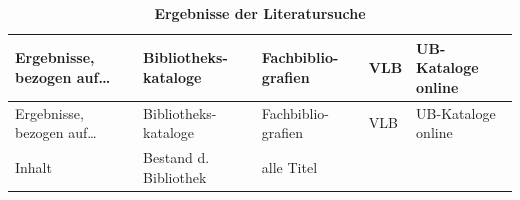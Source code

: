 \documentclass[]{book}
\theoremstyle{definition}
\theoremstyle{definition}
\theoremstyle{definition}
\theoremstyle{remark}
\begin{document}
\begin{longtable}[]{@{}lllll@{}}
\caption{\textbf{\label{tab:literatur-suchen} Ergebnisse der
Literatursuche}}\tabularnewline
\toprule
\begin{minipage}[b]{0.21\columnwidth}\raggedright\strut
Ergebnisse, bezogen auf\ldots{}\strut
\end{minipage} & \begin{minipage}[b]{0.18\columnwidth}\raggedright\strut
Bibliotheks-kataloge\strut
\end{minipage} & \begin{minipage}[b]{0.16\columnwidth}\raggedright\strut
Fachbiblio-grafien\strut
\end{minipage} & \begin{minipage}[b]{0.14\columnwidth}\raggedright\strut
VLB\strut
\end{minipage} & \begin{minipage}[b]{0.18\columnwidth}\raggedright\strut
UB-Kataloge online\strut
\end{minipage}\tabularnewline
\midrule
\endfirsthead
\toprule
\begin{minipage}[b]{0.21\columnwidth}\raggedright\strut
Ergebnisse, bezogen auf\ldots{}\strut
\end{minipage} & \begin{minipage}[b]{0.18\columnwidth}\raggedright\strut
Bibliotheks-kataloge\strut
\end{minipage} & \begin{minipage}[b]{0.16\columnwidth}\raggedright\strut
Fachbiblio-grafien\strut
\end{minipage} & \begin{minipage}[b]{0.14\columnwidth}\raggedright\strut
VLB\strut
\end{minipage} & \begin{minipage}[b]{0.18\columnwidth}\raggedright\strut
UB-Kataloge online\strut
\end{minipage}\tabularnewline
\midrule
\endhead
\begin{minipage}[t]{0.21\columnwidth}\raggedright\strut
Inhalt\vspace{5mm}\strut
\end{minipage} & \begin{minipage}[t]{0.18\columnwidth}\raggedright\strut
Bestand d. Bibliothek\vspace{5mm}\strut
\end{minipage} & \begin{minipage}[t]{0.16\columnwidth}\raggedright\strut
alle Titel\vspace{5mm}\strut

\end{minipage}
\end{longtable}
\end{document}
